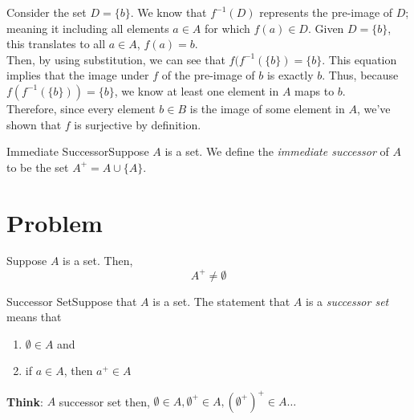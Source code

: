 {                \noindent Consider the set \(D = \{b\}\). We know that \(f^{-1}(D)\) represents the pre-image of \(D\); meaning it including all elements \(a\in A\) for which \(f(a) \in D\). Given \(D = \{b\}\), this translates to all \(a\in A\), \(f(a) = b\). \\
                
                \noindent Then, by using substitution, we can see that \(f(f^{-1}(\{b\}) = \{b\}\). This equation implies that the image under \(f\) of the pre-image of \({b}\) is exactly \({b}\). Thus, because \(f(f^{-1}(\{b\})) = \{b\}\), we know at least one element in \(A\) maps to \(b\). \\

                \noindent Therefore, since every element \(b\in B\) is the image of some element in \(A\), we've shown that \(f\) is surjective by definition.
            }


        \begin{definition}
            {Immediate Successor}Suppose \(A\) is a set. We define the \textit{immediate successor} of \(A\) to be the set \(A^+ = A \cup \{A\}\).
        \end{definition}

        \section{Problem}


            \begin{exercise}
                Suppose \(A\) is a set. Then, \[A^+ \ne \emptyset\]
            \end{exercise}



            \begin{definition}
                {Successor Set}Suppose that \(A\) is a set. The statement that \(A\) is a \textit{successor set} means that \begin{enumerate}
                    \item \(\emptyset \in A\) and 
                    \item if \(a\in A\), then \(a^+ \in A\)
                \end{enumerate}
            \end{definition}

            \textbf{Think}: \(A\) successor set then, \(\emptyset \in A, \emptyset^+\in A, (\emptyset^+)^+\in A \dots\)

    